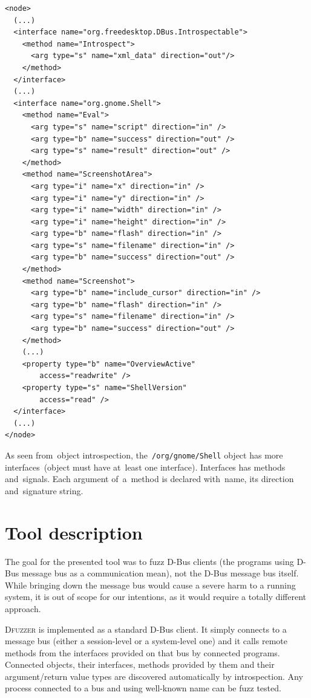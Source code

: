 \documentclass[conference]{IEEEtran}
\begin{document}
{\scriptsize
\begin{verbatim}
<node>
  (...)
  <interface name="org.freedesktop.DBus.Introspectable">
    <method name="Introspect">
      <arg type="s" name="xml_data" direction="out"/>
    </method>
  </interface>
  (...)
  <interface name="org.gnome.Shell">
    <method name="Eval">
      <arg type="s" name="script" direction="in" />
      <arg type="b" name="success" direction="out" />
      <arg type="s" name="result" direction="out" />
    </method>
    <method name="ScreenshotArea">
      <arg type="i" name="x" direction="in" />
      <arg type="i" name="y" direction="in" />
      <arg type="i" name="width" direction="in" />
      <arg type="i" name="height" direction="in" />
      <arg type="b" name="flash" direction="in" />
      <arg type="s" name="filename" direction="in" />
      <arg type="b" name="success" direction="out" />
    </method>
    <method name="Screenshot">
      <arg type="b" name="include_cursor" direction="in" />
      <arg type="b" name="flash" direction="in" />
      <arg type="s" name="filename" direction="in" />
      <arg type="b" name="success" direction="out" />
    </method>
    (...)
    <property type="b" name="OverviewActive"
        access="readwrite" />
    <property type="s" name="ShellVersion"
        access="read" />
  </interface>
  (...)
</node>
\end{verbatim}
}


\noindent
As seen from~object introspection, the~\texttt{/org/gnome/Shell} object has
more interfaces~(object must have at~least one interface). Interfaces has methods
and~signals. Each argument of~a~method is declared with~name, its direction
and~signature string.


\section{Tool description}
\label{sec:C}
The goal for the presented tool was to fuzz D-Bus clients (the programs using
D-Bus message bus as a communication mean), not the D-Bus message bus itself.
While bringing down the message bus would cause a severe harm to a running
system, it is out of scope for our intentions, as it would require a totally different approach.

\textsc{Dfuzzer} is implemented as a standard D-Bus client. It simply connects
to a message bus (either a session-level or a system-level one) and it calls
remote methods from the interfaces provided on that bus by connected programs.
Connected objects, their interfaces, methods provided by them and their
argument/return value types are discovered automatically by introspection. Any
process connected to a bus and using well-known name can be fuzz tested.
\end{document}

